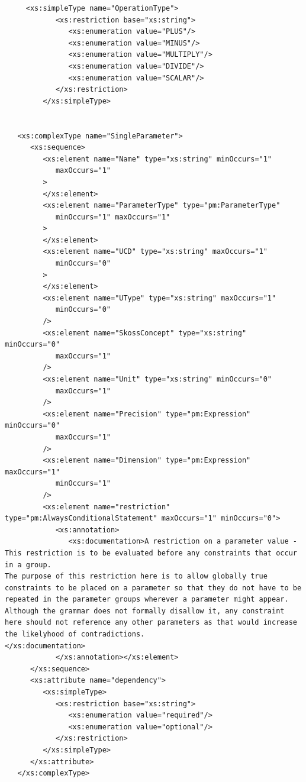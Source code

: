 \documentclass[a4paper,11pt] {ivoa}
\begin{document}
\begin{lstlisting}
     <xs:simpleType name="OperationType">
            <xs:restriction base="xs:string">
               <xs:enumeration value="PLUS"/>
               <xs:enumeration value="MINUS"/>
               <xs:enumeration value="MULTIPLY"/>
               <xs:enumeration value="DIVIDE"/>
               <xs:enumeration value="SCALAR"/>
            </xs:restriction>
         </xs:simpleType>
  

   <xs:complexType name="SingleParameter">
      <xs:sequence>
         <xs:element name="Name" type="xs:string" minOccurs="1"
            maxOccurs="1"
         >
         </xs:element>
         <xs:element name="ParameterType" type="pm:ParameterType"
            minOccurs="1" maxOccurs="1"
         >
         </xs:element>
         <xs:element name="UCD" type="xs:string" maxOccurs="1"
            minOccurs="0"
         >
         </xs:element>
         <xs:element name="UType" type="xs:string" maxOccurs="1"
            minOccurs="0"
         />
         <xs:element name="SkossConcept" type="xs:string" minOccurs="0"
            maxOccurs="1"
         />
         <xs:element name="Unit" type="xs:string" minOccurs="0"
            maxOccurs="1"
         />
         <xs:element name="Precision" type="pm:Expression" minOccurs="0"
            maxOccurs="1"
         />
         <xs:element name="Dimension" type="pm:Expression" maxOccurs="1"
            minOccurs="1"
         />
         <xs:element name="restriction" type="pm:AlwaysConditionalStatement" maxOccurs="1" minOccurs="0">
            <xs:annotation>
               <xs:documentation>A restriction on a parameter value - This restriction is to be evaluated before any constraints that occur in a group. 
The purpose of this restriction here is to allow globally true constraints to be placed on a parameter so that they do not have to be repeated in the parameter groups wherever a parameter might appear.
Although the grammar does not formally disallow it, any constraint here should not reference any other parameters as that would increase the likelyhood of contradictions.
</xs:documentation>
            </xs:annotation></xs:element>
      </xs:sequence>
      <xs:attribute name="dependency">
         <xs:simpleType>
            <xs:restriction base="xs:string">
               <xs:enumeration value="required"/>
               <xs:enumeration value="optional"/>
            </xs:restriction>
         </xs:simpleType>
      </xs:attribute>
   </xs:complexType>


\end{lstlisting}
\end{document}
